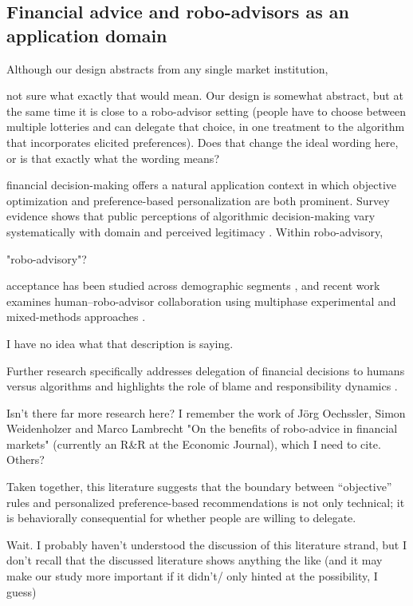 \documentclass[a4paper, 12pt, fleqn]{article}
\theoremstyle{definition}
\begin{document}
\subsection{Financial advice and robo-advisors as an application domain}
Although our design abstracts from any single market institution, 
\begin{icomm}
	not sure what exactly that would mean. Our design is somewhat abstract, but at the same time it is close to a robo-advisor setting (people have to choose between multiple lotteries and can delegate that choice, in one treatment to the algorithm that incorporates elicited preferences). Does that change the ideal wording here, or is that exactly what the wording means?
\end{icomm}
financial decision-making offers a natural application context in which objective optimization and preference-based personalization are both prominent. Survey evidence shows that public perceptions of algorithmic decision-making vary systematically with domain and perceived legitimacy \citep{Aysolmaz2023}. Within robo-advisory, 
\begin{icomm}
	"robo-advisory"?
\end{icomm}
acceptance has been studied across demographic segments \citep{Figa-Talamanca2022}, and recent work examines human--robo-advisor collaboration using multiphase experimental and mixed-methods approaches \citep{Mahmud2025}. 
\begin{icomm}
	I have no idea what that description is saying.
\end{icomm}
Further research specifically addresses delegation of financial decisions to humans versus algorithms and highlights the role of blame and responsibility dynamics \citep{Ismagilova2025}. 
\begin{icomm}
	Isn't there far more research here? I remember the work of Jörg Oechssler, Simon Weidenholzer and Marco Lambrecht "On the benefits of robo-advice in financial markets" (currently an R\&R at the Economic Journal), which I need to cite. Others?
\end{icomm}
Taken together, this literature suggests that the boundary between ``objective'' rules and personalized preference-based recommendations is not only technical; it is behaviorally consequential for whether people are willing to delegate.
\begin{icomm}
	Wait. I probably haven't understood the discussion of this literature strand, but I don't recall that the discussed literature shows anything the like (and it may make our study more important if it didn't/ only hinted at the possibility, I guess)
\end{icomm}
\end{document}
